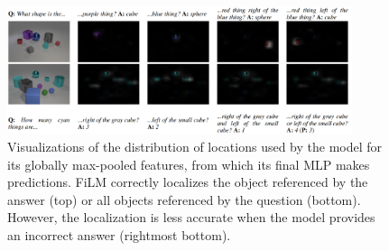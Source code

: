 \begin{figure}[t]
    \centering
    \includegraphics[width=0.9\textwidth]{figures/images/film/film_attention.png}
    \caption{Visualizations of the distribution of locations used by the model for its globally max-pooled features, from which its final MLP makes predictions. FiLM correctly localizes the object referenced by the answer (top) or all objects referenced by the question (bottom). However, the localization is less accurate when the model provides an incorrect answer (rightmost bottom).}
    \label{fig:film_attention}
\end{figure}
